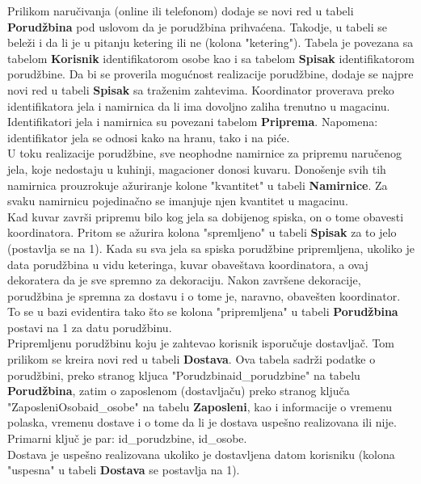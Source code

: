 Prilikom naručivanja (online ili telefonom) dodaje se novi red u tabeli \textbf{Porudžbina} pod uslovom da je porudžbina prihvaćena. Takodje, u tabeli se bele\v zi i da li je u pitanju ketering ili ne (kolona "ketering"). Tabela je povezana sa tabelom \textbf{Korisnik} identifikatorom osobe kao i sa tabelom \textbf{Spisak} identifikatorom porudžbine. Da bi se proverila mogućnost realizacije porudžbine, dodaje se najpre novi red u tabeli \textbf{Spisak} sa traženim zahtevima. Koordinator proverava preko identifikatora jela i namirnica da li ima dovoljno zaliha trenutno u magacinu. Identifikatori jela i namirnica su povezani tabelom \textbf{Priprema}. Napomena: identifikator jela se odnosi kako na hranu, tako i na piće.
\\

U toku realizacije porud\v zbine, sve neophodne namirnice za pripremu naru\v cenog jela, koje nedostaju u kuhinji, magacioner donosi kuvaru. Dono\v senje svih tih namirnica prouzrokuje a\v zuriranje kolone "kvantitet" u tabeli \textbf{Namirnice}. Za svaku namirnicu pojedina\v cno se imanjuje njen kvantitet u magacinu.\\

\indent Kad kuvar zavr\v si pripremu bilo kog jela sa dobijenog spiska, on o tome obavesti koordinatora. Pritom se a\v zurira kolona "spremljeno" u tabeli \textbf{Spisak} za to jelo (postavlja se na 1). Kada su sva jela sa spiska porud\v zbine pripremljena, ukoliko je data porud\v zbina u vidu keteringa, kuvar obave\v stava koordinatora, a ovaj dekoratera da je sve spremno za dekoraciju. Nakon zavr\v sene dekoracije, porud\v zbina je spremna za dostavu i o tome je, naravno, obave\v sten koordinator. To se u bazi evidentira tako \v sto se kolona "pripre\-mljena" u tabeli \textbf{Porud\v zbina} postavi na 1 za datu porud\v zbinu.\\

\indent Pripremljenu porud\v zbinu koju je zahtevao korisnik isporu\v cuje dostavlja\v c. Tom prilikom se kreira novi red u tabeli \textbf{Dostava}. Ova tabela sadr\v zi podatke o porud\v zbini, preko stranog kljuca "Porudzbinaid\_porudzbine" na tabelu \textbf{Porud\v zbina}, zatim o zaposlenom (dostavlja\v cu) preko stranog klju\v ca "ZaposleniOsobaid\_osobe" na tabelu  \textbf{Zaposleni}, kao i informacije o vremenu polaska, vremenu dostave i o tome da li je dostava uspe\v sno realizovana ili nije. Primarni klju\v c je par: id\_porudzbine, id\_osobe.\\
\indent Dostava je uspe\v sno realizovana ukoliko je dostavljena datom korisniku (kolona "uspesna" u tabeli \textbf{Dostava} se postavlja na 1).\\

